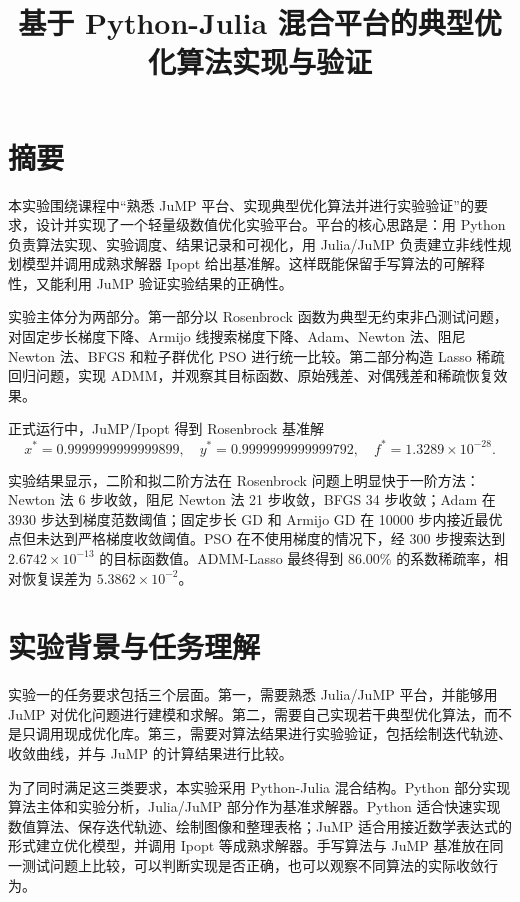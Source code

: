 \documentclass[UTF8,a4paper,12pt,fontset=none]{ctexart}
\title{基于 Python-Julia 混合平台的典型优化算法实现与验证}
\author{}
\date{}
\begin{document}
\maketitle
\tableofcontents
\newpage

\section{摘要}

本实验围绕课程中“熟悉 JuMP 平台、实现典型优化算法并进行实验验证”的要求，设计并实现了一个轻量级数值优化实验平台。平台的核心思路是：用 Python 负责算法实现、实验调度、结果记录和可视化，用 Julia/JuMP 负责建立非线性规划模型并调用成熟求解器 Ipopt 给出基准解。这样既能保留手写算法的可解释性，又能利用 JuMP 验证实验结果的正确性。

实验主体分为两部分。第一部分以 Rosenbrock 函数为典型无约束非凸测试问题，对固定步长梯度下降、Armijo 线搜索梯度下降、Adam、Newton 法、阻尼 Newton 法、BFGS 和粒子群优化 PSO 进行统一比较。第二部分构造 Lasso 稀疏回归问题，实现 ADMM，并观察其目标函数、原始残差、对偶残差和稀疏恢复效果。

正式运行中，JuMP/Ipopt 得到 Rosenbrock 基准解
\[
x^*=0.9999999999999899,\quad y^*=0.9999999999999792,\quad f^*=1.3289\times 10^{-28}.
\]

实验结果显示，二阶和拟二阶方法在 Rosenbrock 问题上明显快于一阶方法：Newton 法 6 步收敛，阻尼 Newton 法 21 步收敛，BFGS 34 步收敛；Adam 在 3930 步达到梯度范数阈值；固定步长 GD 和 Armijo GD 在 10000 步内接近最优点但未达到严格梯度收敛阈值。PSO 在不使用梯度的情况下，经 300 步搜索达到 $2.6742\times 10^{-13}$ 的目标函数值。ADMM-Lasso 最终得到 86.00\% 的系数稀疏率，相对恢复误差为 $5.3862\times 10^{-2}$。

\section{实验背景与任务理解}

实验一的任务要求包括三个层面。第一，需要熟悉 Julia/JuMP 平台，并能够用 JuMP 对优化问题进行建模和求解。第二，需要自己实现若干典型优化算法，而不是只调用现成优化库。第三，需要对算法结果进行实验验证，包括绘制迭代轨迹、收敛曲线，并与 JuMP 的计算结果进行比较。

为了同时满足这三类要求，本实验采用 Python-Julia 混合结构。Python 部分实现算法主体和实验分析，Julia/JuMP 部分作为基准求解器。Python 适合快速实现数值算法、保存迭代轨迹、绘制图像和整理表格；JuMP 适合用接近数学表达式的形式建立优化模型，并调用 Ipopt 等成熟求解器。手写算法与 JuMP 基准放在同一测试问题上比较，可以判断实现是否正确，也可以观察不同算法的实际收敛行为。
\end{document}
